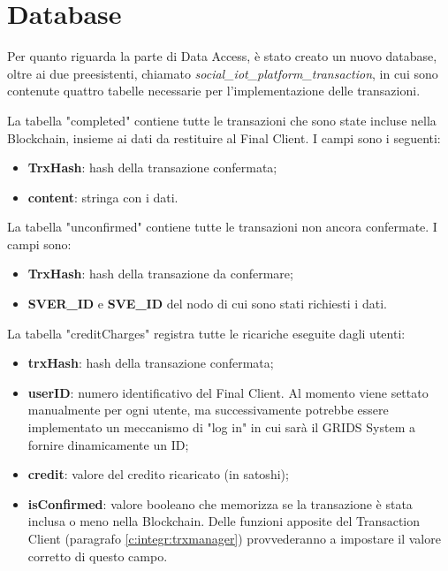 \section{Database}
\label{c:integr:db}

Per quanto riguarda la parte di Data Access, è stato creato un nuovo database, oltre ai due preesistenti, chiamato \textit{social\_iot\_platform\_transaction}, in cui sono contenute quattro tabelle necessarie per l'implementazione delle transazioni.

La tabella "completed" contiene tutte le transazioni che sono state incluse nella Blockchain, insieme ai dati da restituire al Final Client. I campi sono i seguenti:

\begin{itemize}
    \item \textbf{TrxHash}: hash della transazione confermata;
	\item \textbf{content}: stringa con i dati.
\end{itemize}

La tabella "unconfirmed" contiene tutte le transazioni non ancora confermate. I campi sono:

\begin{itemize}
    \item \textbf{TrxHash}: hash della transazione da confermare;
    \item \textbf{SVER\_ID} e \textbf{SVE\_ID} del nodo di cui sono stati richiesti i dati.
\end{itemize}

La tabella "creditCharges" registra tutte le ricariche eseguite dagli utenti:

\begin{itemize}
    \item \textbf{trxHash}: hash della transazione confermata;
	\item \textbf{userID}: numero identificativo del Final Client. Al momento viene settato manualmente per ogni utente, ma successivamente potrebbe essere implementato un meccanismo di "log in" in cui sarà il GRIDS System a fornire dinamicamente un ID;
	\item \textbf{credit}: valore del credito ricaricato (in satoshi);
	\item \textbf{isConfirmed}: valore booleano che memorizza se la transazione è stata inclusa o meno nella Blockchain. Delle funzioni apposite del Transaction Client (paragrafo \ref{c:integr:trxmanager}) provvederanno a impostare il valore corretto di questo campo.
\end{itemize}

